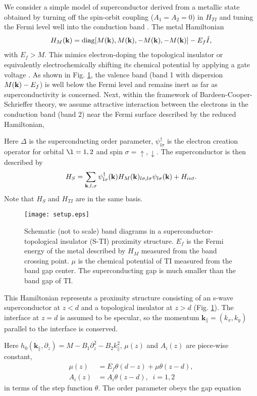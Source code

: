 \documentclass[12pt,twocolumn]{article}
\begin{document}
We consider a simple model of superconductor derived from a metallic
state obtained by turning off the spin-orbit coupling ($A_1=A_2=0$) in
$H_{TI}$ and tuning the Fermi level well into the conduction band \cite{zhao}. The metal
Hamiltonian
\begin{eqnarray}
H_{M}({\bf k})=\mathrm{diag} [M({\bf k}), M({\bf k}), -M({\bf k}), -M({\bf k})]-E_f \hat{I},
\end{eqnarray}
with  $E_f>M$. 
This mimics electron-doping the topological insulator \cite{cu2} 
or equivalently electrochemically
shifting its chemical potential by applying a gate voltage \cite{gate}.
As shown in Fig. \ref{setup}, 
the valence band (band 1 with dispersion $M({\bf k})-E_f$) is well below the Fermi level and remains inert as far as 
superconductivity is concerned.  Next, within the framework of Bardeen-Cooper-Schrieffer
theory, we assume attractive interaction between
the electrons in the conduction band (band 2) near the Fermi surface described by the reduced
 Hamiltonian,

Here $\Delta$ is the 
superconducting order parameter, $\psi^\dagger_{l\sigma}$ is the electron creation operator for orbital $\l=1,2$ and
spin $\sigma=\uparrow,\downarrow$. The superconductor is then described by 
\begin{equation}
H_S=\sum_{{\bf k},l,\sigma}\psi^\dagger_{l\sigma}({\bf k})H_M({\bf k})_{l\sigma,l\sigma}\psi_{l\sigma}({\bf k})+H_{int}.
\end{equation}
Note that $H_S$ and $H_{TI}$ are in the same 
basis.


\begin{figure}
\texttt{[image: setup.eps]}
\caption{Schematic (not to scale) band diagrams  in a superconductor-topological insulator (S-TI) proximity
structure. $E_f$ is the Fermi energy of the metal described by $H_M$ measured from the band crossing point. $\mu$ is
the chemical potential of TI measured from the band gap center. The superconducting gap
is much smaller than the band gap of TI.
}\label{setup}
\end{figure}

This Hamiltonian represents a proximity structure consisting 
of an s-wave superconductor at $z<d$ and a topological insulator at $z>d$ (Fig. \ref{setup}).
The interface at $z=d$ is assumed to be specular, so the momentum $\mathbf{k_\parallel}=(k_x,k_y)$ 
parallel to the interface is conserved.

Here $h_0(\mathbf{k}_\parallel, \partial_z)=M -B_1 \partial_z^2 -B_2 k_\parallel^2$, $\mu(z)$ and $A_i(z)$
are piece-wise constant, 
\begin{eqnarray}
\mu(z)&=E_f\theta(d-z)+\mu\theta(z-d),\\
A_i(z)&=A_i\theta(z-d),\;\;i=1,2
\end{eqnarray}
in terms of the step function $\theta$. The order parameter obeys the gap equation
\end{document}
